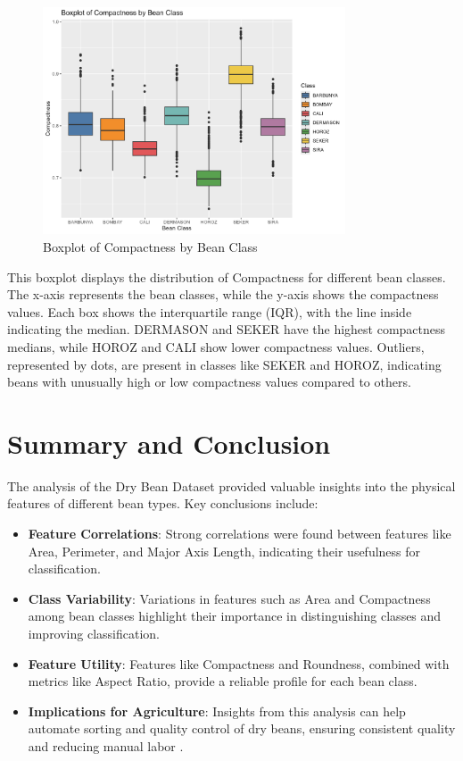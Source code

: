 \documentclass[a4paper,12pt]{article}
\begin{document}
\begin{figure}[H]
    \centering
    \includegraphics[width=0.8\textwidth]{graphs/boxplot_compactness.png}
    \caption{Boxplot of Compactness by Bean Class}
    \label{fig:boxplot_compactness}
\end{figure}
This boxplot displays the distribution of Compactness for different bean classes. The x-axis represents the bean classes, while the y-axis shows the compactness values. Each box shows the interquartile range (IQR), with the line inside indicating the median. DERMASON and SEKER have the highest compactness medians, while HOROZ and CALI show lower compactness values. Outliers, represented by dots, are present in classes like SEKER and HOROZ, indicating beans with unusually high or low compactness values compared to others.

\newpage

\section{Summary and Conclusion}
The analysis of the Dry Bean Dataset provided valuable insights into the physical features of different bean types. Key conclusions include:
\begin{itemize}
    \item \textbf{Feature Correlations}: Strong correlations were found between features like Area, Perimeter, and Major Axis Length, indicating their usefulness for classification.
    
    \item \textbf{Class Variability}: Variations in features such as Area and Compactness among bean classes highlight their importance in distinguishing classes and improving classification.
    
    \item \textbf{Feature Utility}: Features like Compactness and Roundness, combined with metrics like Aspect Ratio, provide a reliable profile for each bean class.
    
    \item \textbf{Implications for Agriculture}: Insights from this analysis can help automate sorting and quality control of dry beans, ensuring consistent quality and reducing manual labor \cite{sandeep2022modern}.
\end{itemize}
\end{document}
